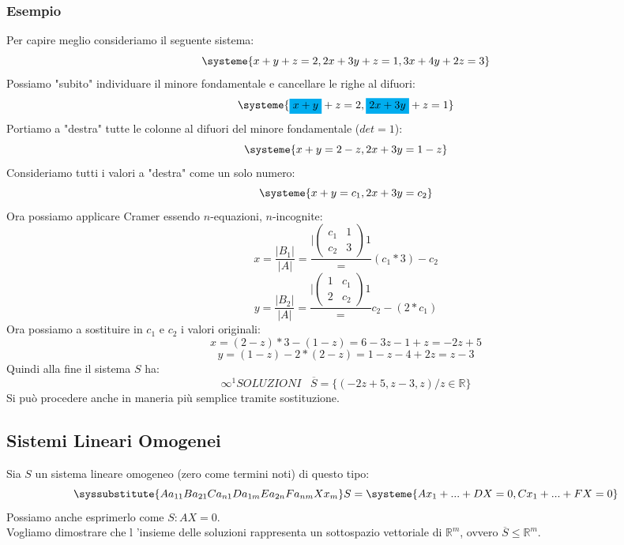 \subsubsection{Esempio}
Per capire meglio consideriamo il seguente sistema:
$$ 
\systeme
{
x+y+z = 2,
2x+3y+z=1,
3x+4y+2z=3
}
$$
Possiamo "subito" individuare il minore fondamentale e cancellare le righe al difuori:
$$ 
\systeme
{
\mathcolorbox{cyan}{x+y}+z = 2,
\mathcolorbox{cyan}{2x+3y}+z=1
}
$$
Portiamo a "destra" tutte le colonne al difuori del minore fondamentale ($det = 1$):
$$ 
\systeme
{
x+y = 2-z,
2x+3y=1-z
}
$$
Consideriamo tutti i valori a "destra" come un solo numero:
$$ 
\systeme
{
x+y = c_1,
2x+3y=c_2
}
$$
Ora possiamo applicare Cramer essendo $n$-equazioni, $n$-incognite:
$$ 
x = \frac{|B_1|}{|A|} = \frac{|\begin{pmatrix}c_1 & 1 \\ c_2 & 3\end{pmatrix}1} = (c_1*3)-c_2
$$
$$
y = \frac{|B_2|}{|A|} = \frac{|\begin{pmatrix}1 & c_1  \\ 2 & c_2\end{pmatrix}1} = c_2-(2*c_1)
$$
Ora possiamo a sostituire in $c_1$ e $c_2$ i valori originali:
$$ x = (2-z)*3 -(1-z) = 6-3z-1+z = -2z +5  $$
$$ y = (1-z)-2*(2-z) = 1-z-4+2z = z-3$$
Quindi alla fine il sistema $S$ ha:
$$ \infty^1 SOLUZIONI \;\;\; \overline{S} = \{(-2z+5,z-3,z)/ z \in \mathbb{R}\}$$
Si può procedere anche in maneria più semplice tramite sostituzione.

\subsection{Sistemi Lineari Omogenei}
Sia $S$ un sistema lineare omogeneo (zero come termini noti) di questo tipo:
$$
\syssubstitute{A{a_{11}}B{a_{21}}C{a_{n1}}D{a_{1m}}E{a_{2n}}F{a_{nm}}X{x_{m}}}
S=
\systeme{
  A x_1 +...+ D X  = 0,
  C x_1 +...+ F X = 0
}
$$
Possiamo anche esprimerlo come $S: AX=0$.\\
Vogliamo dimostrare che l ’insieme delle soluzioni rappresenta un sottospazio vettoriale di $\mathbb{R}^m$, ovvero $\overline{S} \le \mathbb{R}^m$.\\

